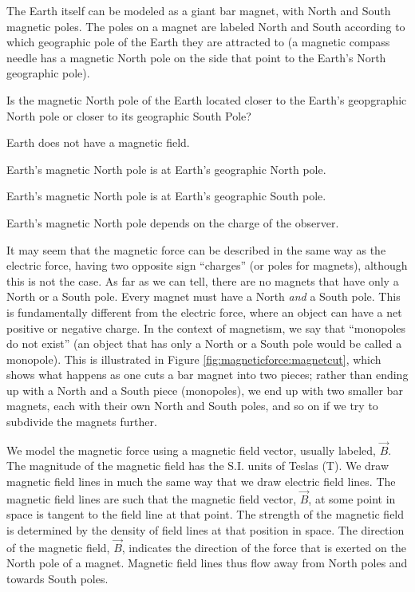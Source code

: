 The Earth itself can be modeled as a giant bar magnet, with North and South magnetic poles. The poles on a magnet are labeled North and South according to which geographic pole of the Earth they are attracted to (a magnetic compass needle has a magnetic North pole on the side that point to the Earth's North geographic pole).
\begin{checkpoint}{}
	\begin{MCquestion}{Is the magnetic North pole of the Earth located closer to the Earth's geopgraphic North pole or closer to its geographic South Pole?}
		\item Earth does not have a magnetic field.
		\item Earth's magnetic North pole is at Earth's geographic North pole.
		\item Earth's magnetic North pole is at Earth's geographic South pole. \correct
		\item Earth's magnetic North pole depends on the charge of the observer.
	\end{MCquestion}
\end{checkpoint}

It may seem that the magnetic force can be described in the same way as the electric force, having two opposite sign ``charges'' (or poles for magnets), although this is not the case. As far as we can tell, there are no magnets that have only a North or a South pole. Every magnet must have a North \textit{and} a South pole. This is fundamentally different from the electric force, where an object can have a net positive or negative charge. In the context of magnetism, we say that ``monopoles do not exist'' (an object that has only a North or a South pole would be called a monopole). This is illustrated in Figure \ref{fig:magneticforce:magnetcut}, which shows what happens as one cuts a bar magnet into two pieces; rather than ending up with a North and a South piece (monopoles), we end up with two smaller bar magnets, each with their own North and South poles, and so on if we try to subdivide the magnets further.


We model the magnetic force using a magnetic field vector, usually labeled, $\vec B$. The magnitude of the magnetic field has the S.I. units of Teslas (\si{T}). We draw magnetic field lines in much the same way that we draw electric field lines. The magnetic field lines are such that the magnetic field vector, $\vec B$, at some point in space is tangent to the field line at that point. The strength of the magnetic field is determined by the density of field lines at that position in space. The direction of the magnetic field, $\vec B$, indicates the direction of the force that is exerted on the North pole of a magnet. Magnetic field lines thus flow away from North poles and towards South poles. 


